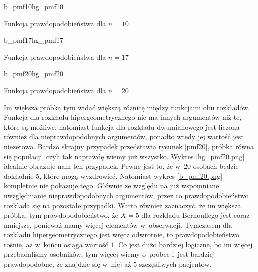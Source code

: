 \begin{diagrams}{b_pmf10}{hg_pmf10}
	\caption{Funkcja prawdopodobieństwa dla $n=10$}
	\label{pmf10}
\end{diagrams}

\begin{diagrams}{b_pmf17}{hg_pmf17}
	\caption{Funkcja prawdopodobieństwa dla $n=17$}
	\label{pmf17}
\end{diagrams}

\begin{diagrams}{b_pmf20}{hg_pmf20}
	\caption{Funkcja prawdopodobieństwa dla $n=20$}
	\label{pmf20}
\end{diagrams}

Im większa próbka tym widać większą różnicę między funkcjami obu rozkładów. Funkcja dla rozkładu hipergeometrycznego nie ma innych argumentów niż te, które są możliwe, natomiast funkcja dla rozkładu dwumianowego jest liczona również dla nieprawdopodobnych argumentów, ponadto wtedy jej wartość jest niezerowa. Bardzo skrajny przypadek przedstawia rysunek \ref{pmf20}, próbka równa się populacji, czyli tak naprawdę wiemy już wszystko. Wykres \ref{hg_pmf20.png} idealnie obrazuje nam ten przypadek. Pewne jest to, że w~$20$ osobach będzie dokładnie $5$, które mogą wyzdrowieć. Natomiast wykres \ref{b_pmf20.png} kompletnie nie pokazuje tego. Głównie ze względu na już wspomniane uwzględnianie nieprawdopodobnych argumentów, przez co prawdopodobieństwo rozkłada się na pozostałe przypadki. Warto również zaznaczyć, że im większa próbka, tym prawdopodobieństwo, że $X=5$ dla rozkładu Bernoullego jest coraz mniejsze, ponieważ mamy więcej elementów w~obserwacji. Tymczasem dla rozkładu hipergeometrycznego jest wręcz odwrotnie, to prawdopodobieństwo rośnie, aż w~końcu osiąga wartość $1$. Co jest dużo bardziej logiczne, bo im więcej przebadaliśmy osobników, tym więcej wiemy o~próbce i~jest bardziej prawdopodobne, że znajdzie się w~niej aż $5$ szczęśliwych pacjentów.

